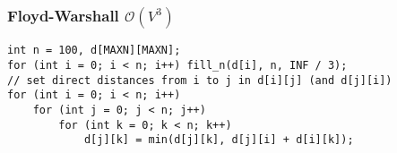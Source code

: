 \documentclass{article}
\begin{document}
\begin{comment}
\subsubsection{BFS $\mathcal{O}(V + E)$}

\begin{lstlisting}
int n, dist[MAXN];
vi edges[MAXN]; // (to, cost)

// faster than dijkstra when all edge costs are the same
int bfs(int from, int to) {
	fill_n(dist, n, -1);
	dist[from] = 0;

	queue<int> q;
	q.push(from);
	while (!q.empty()) {
		int cur = q.front();
		q.pop();
		for (int nxt : edges[cur]) {
			if (dist[nxt] >= 0) {
				dist[nxt] = dist[cur] + 1;
				if (nxt == to) return dist[nxt];
				q.push(nxt);
			}
		}
	}
	return -1;
}
\end{lstlisting}
\end{comment}

\begin{comment}
\subsubsection{Dijkstra $\mathcal{O}(E + V \log V)$}

\begin{lstlisting}
int n, dist[MAXN];
bool vis[MAXN];
vector<pii> edges[MAXN]; // (to, cost)

void dijkstra() {
	fill_n(vis, n, false);
	priority_queue<pii, vector<pii>, greater<pii> > q; // (dist, vertex)
	q.push(pii(0, 0));

	while (!q.empty()) {
		pii v = q.top();
		q.pop();

		if (vis[v.y]) continue;
		vis[v.y] = true;

		for (const pii e : edges[v.y]) {
			q.push(pii(v.x + e.y, e.x));
		}
		dist[v.y] = v.x;
	}
}
\end{lstlisting}
\end{comment}

\subsubsection{Floyd-Warshall $\mathcal{O}(V^{3})$}

\begin{lstlisting}
int n = 100, d[MAXN][MAXN];
for (int i = 0; i < n; i++) fill_n(d[i], n, INF / 3);
// set direct distances from i to j in d[i][j] (and d[j][i])
for (int i = 0; i < n; i++)
	for (int j = 0; j < n; j++)
		for (int k = 0; k < n; k++)
			d[j][k] = min(d[j][k], d[j][i] + d[i][k]);
\end{lstlisting}
\end{document}
